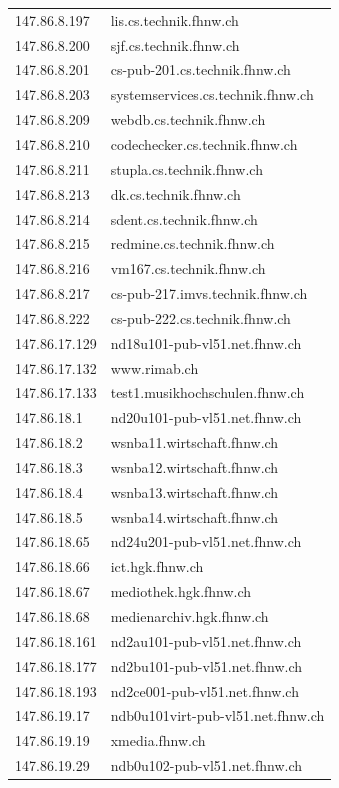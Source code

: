 \documentclass[a4paper,11pt]{scrartcl}
\begin{document}
\begin{longtable}{p{2.5cm}|p{7cm}}
	147.86.8.197 & lis.cs.technik.fhnw.ch \\ 
	147.86.8.200 & sjf.cs.technik.fhnw.ch \\ 
	147.86.8.201 & cs-pub-201.cs.technik.fhnw.ch \\ 
	147.86.8.203 & systemservices.cs.technik.fhnw.ch \\ 
	147.86.8.209 & webdb.cs.technik.fhnw.ch \\ 
	147.86.8.210 & codechecker.cs.technik.fhnw.ch \\ 
	147.86.8.211 & stupla.cs.technik.fhnw.ch \\ 
	147.86.8.213 & dk.cs.technik.fhnw.ch \\ 
	147.86.8.214 & sdent.cs.technik.fhnw.ch \\ 
	147.86.8.215 & redmine.cs.technik.fhnw.ch \\ 
	147.86.8.216 & vm167.cs.technik.fhnw.ch \\ 
	147.86.8.217 & cs-pub-217.imvs.technik.fhnw.ch \\ 
	147.86.8.222 & cs-pub-222.cs.technik.fhnw.ch \\ 
	147.86.17.129 & nd18u101-pub-vl51.net.fhnw.ch \\ 
	147.86.17.132 & www.rimab.ch \\ 
	147.86.17.133 & test1.musikhochschulen.fhnw.ch \\ 
	147.86.18.1 & nd20u101-pub-vl51.net.fhnw.ch \\ 
	147.86.18.2 & wsnba11.wirtschaft.fhnw.ch \\ 
	147.86.18.3 & wsnba12.wirtschaft.fhnw.ch \\ 
	147.86.18.4 & wsnba13.wirtschaft.fhnw.ch \\ 
	147.86.18.5 & wsnba14.wirtschaft.fhnw.ch \\ 
	147.86.18.65 & nd24u201-pub-vl51.net.fhnw.ch \\ 
	147.86.18.66 & ict.hgk.fhnw.ch \\ 
	147.86.18.67 & mediothek.hgk.fhnw.ch \\ 
	147.86.18.68 & medienarchiv.hgk.fhnw.ch \\ 
	147.86.18.161 & nd2au101-pub-vl51.net.fhnw.ch \\ 
	147.86.18.177 & nd2bu101-pub-vl51.net.fhnw.ch \\ 
	147.86.18.193 & nd2ce001-pub-vl51.net.fhnw.ch \\ 
	147.86.19.17 & ndb0u101virt-pub-vl51.net.fhnw.ch \\ 
	147.86.19.19 & xmedia.fhnw.ch \\ 
	147.86.19.29 & ndb0u102-pub-vl51.net.fhnw.ch \\ 

\end{longtable}
\end{document}
